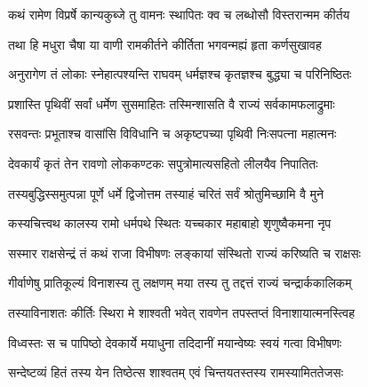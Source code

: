 

\storymeta



\twolineshloka
{कथं रामेण विप्रर्षे कान्यकुब्जे तु वामनः}
{स्थापितः क्व च लब्धोसौ विस्तरान्मम कीर्तय}%

\twolineshloka
{तथा हि मधुरा चैषा या वाणी रामकीर्तने}
{कीर्तिता भगवन्मह्यं हृता कर्णसुखावह}%

\twolineshloka
{अनुरागेण तं लोकाः स्नेहात्पश्यन्ति राघवम्}
{धर्मज्ञश्च कृतज्ञश्च बुद्ध्या च परिनिष्ठितः}%

\twolineshloka
{प्रशास्ति पृथिवीं सर्वां धर्मेण सुसमाहितः}
{तस्मिन्शासति वै राज्यं सर्वकामफलाद्रुमाः}%

\twolineshloka
{रसवन्तः प्रभूताश्च वासांसि विविधानि च}
{अकृष्टपच्या पृथिवी निःसपत्ना महात्मनः}%

\twolineshloka
{देवकार्यं कृतं तेन रावणो लोककण्टकः}
{सपुत्रोमात्यसहितो लीलयैव निपातितः}%

\twolineshloka
{तस्यबुद्धिस्समुत्पन्ना पूर्णे धर्मे द्विजोत्तम}
{तस्याहं चरितं सर्वं श्रोतुमिच्छामि वै मुने}%


\twolineshloka
{कस्यचित्त्वथ कालस्य रामो धर्मपथे स्थितः}
{यच्चकार महाबाहो शृणुष्वैकमना नृप}%

\twolineshloka
{सस्मार राक्षसेन्द्रं तं कथं राजा विभीषणः}
{लङ्कायां संस्थितो राज्यं करिष्यति च राक्षसः}%

\twolineshloka
{गीर्वाणेषु प्रातिकूल्यं विनाशस्य तु लक्षणम्}
{मया तस्य तु तद्दत्तं राज्यं चन्द्रार्ककालिकम्}%

\twolineshloka
{तस्याविनाशतः कीर्तिः स्थिरा मे शाश्वती भवेत्}
{रावणेन तपस्तप्तं विनाशायात्मनस्त्विह}%

\twolineshloka
{विध्वस्तः स च पापिष्ठो देवकार्ये मयाधुना}
{तदिदानीं मयान्वेष्यः स्वयं गत्वा विभीषणः}%

\twolineshloka
{सन्देष्टव्यं हितं तस्य येन तिष्ठेत्स शाश्वतम्}
{एवं चिन्तयतस्तस्य रामस्यामिततेजसः}%

